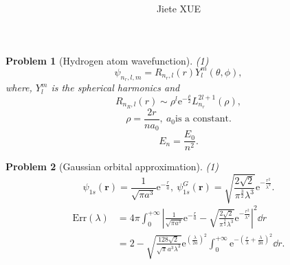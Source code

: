 \documentclass{article}
\title{\textbf{\mytitle}}
\author{Jiete XUE}
\date{\mydate}
\theoremstyle{1}
\newtheorem{problem}{Problem}
\newcommand{\ee}{\mathrm{e}}
\begin{document}
\maketitle
\begin{problem}[Hydrogen atom wavefunction]
(1) 
\begin{equation}
    \psi_{n_r,l,m}=R_{n_r,l}(r)Y_{l}^m(\theta,\phi),
\end{equation}
where, $Y_l^m$ is the spherical harmonics and 
\begin{equation}
    R_{n_R,l}(r)\sim \rho^l \ee^{-\frac{\rho}{2}}L_{n_r}^{2l+1}(\rho),
\end{equation}
\begin{equation}
    \rho=\frac{2r}{na_0},\ a_0 \text{is a constant.}
\end{equation}
\begin{equation}
    E_n=\frac{E_0}{n^2}.
\end{equation}


\end{problem}
\begin{problem}[Gaussian orbital approximation]
    (1) 
    \begin{equation}
        \psi_{1s}(\mathbf{r})=\frac{1}{\sqrt{\pi a^3}}\ee^{-\frac{r}{a}},\ \psi_{1s}^G(\mathbf{r})=\sqrt{\frac{2\sqrt{2}}{\pi^\frac{3}{2}\lambda^3}}\ee^{-\frac{r^2}{\lambda^2}}.
    \end{equation}
    \begin{equation}
    \begin{aligned}
            \mathrm{Err}(\lambda)&=4\pi\int_{0}^{+\infty}\left|\frac{1}{\sqrt{\pi a^3}}\ee^{-\frac{r}{a}}-\sqrt{\frac{2\sqrt{2}}{\pi^\frac{3}{2}\lambda^3}}\ee^{-\frac{r^2}{\lambda^2}}\right|^2\dd{r}\\
            &=2-\sqrt{\frac{128\sqrt{2}}{\sqrt{\pi}a^3\lambda^3}}\ee^{\left(\frac{\lambda}{2a}\right)^2}\int_{0}^{+\infty}\ee^{-\left(\frac{r}{\lambda}+\frac{\lambda}{2a}\right)^2}\dd{r}.
    \end{aligned}
    \end{equation}
    
\end{problem}
\end{document}
